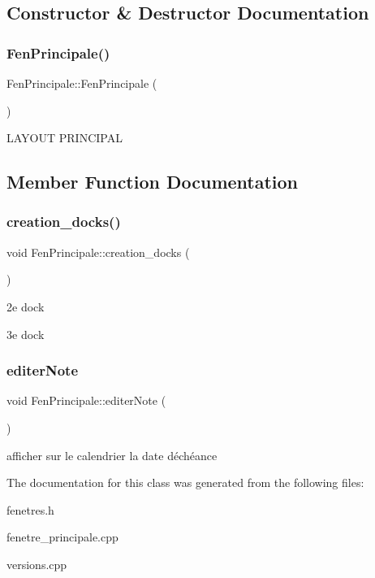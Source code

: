 \subsection{Constructor \& Destructor Documentation}
\mbox{\label{class_fen_principale_a529a35ea032da250ad37f7355d1388be}} 
\subsubsection{\texorpdfstring{Fen\+Principale()}{FenPrincipale()}}
{\footnotesize\ttfamily Fen\+Principale\+::\+Fen\+Principale (\begin{DoxyParamCaption}{ }\end{DoxyParamCaption})}

L\+A\+Y\+O\+UT P\+R\+I\+N\+C\+I\+P\+AL 

\subsection{Member Function Documentation}
\mbox{\label{class_fen_principale_ab3ef99b1adb06c0bcc57ea74ca34923e}} 
\subsubsection{\texorpdfstring{creation\+\_\+docks()}{creation\_docks()}}
{\footnotesize\ttfamily void Fen\+Principale\+::creation\+\_\+docks (\begin{DoxyParamCaption}{ }\end{DoxyParamCaption})\hspace{0.3cm}{\ttfamily [protected]}}

2e dock

3e dock \mbox{\label{class_fen_principale_ab8b916f06d0c149b1411781e7129fab5}} 
\subsubsection{\texorpdfstring{editer\+Note}{editerNote}}
{\footnotesize\ttfamily void Fen\+Principale\+::editer\+Note (\begin{DoxyParamCaption}{ }\end{DoxyParamCaption})\hspace{0.3cm}{\ttfamily [slot]}}

afficher sur le calendrier la date d\textquotesingle{}échéance 

The documentation for this class was generated from the following files\+:\begin{DoxyCompactItemize}
\item 
fenetres.\+h\item 
fenetre\+\_\+principale.\+cpp\item 
versions.\+cpp\end{DoxyCompactItemize}
